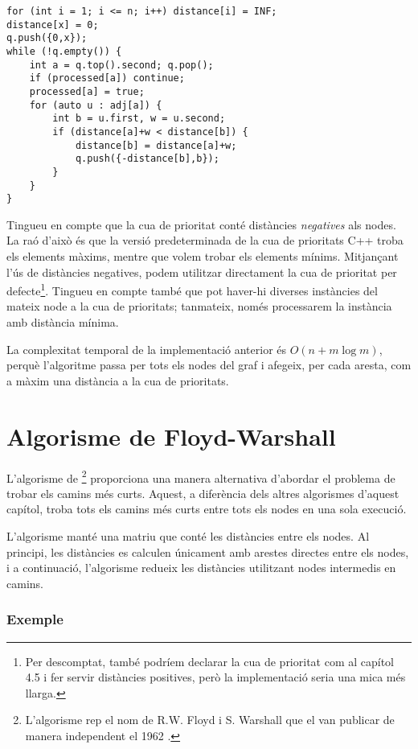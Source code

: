 \begin{lstlisting}
for (int i = 1; i <= n; i++) distance[i] = INF;
distance[x] = 0;
q.push({0,x});
while (!q.empty()) {
    int a = q.top().second; q.pop();
    if (processed[a]) continue;
    processed[a] = true;
    for (auto u : adj[a]) {
        int b = u.first, w = u.second;
        if (distance[a]+w < distance[b]) {
            distance[b] = distance[a]+w;
            q.push({-distance[b],b});
        }
    }
}
\end{lstlisting}


Tingueu en compte que la cua de prioritat conté distàncies
\emph{negatives} als nodes. La raó d'això és que la versió
predeterminada de la cua de prioritats C++ troba els elements màxims,
mentre que volem trobar els elements mínims. Mitjançant l'ús de
distàncies negatives, podem utilitzar directament la cua de prioritat
per defecte\footnote{Per descomptat, també podríem declarar la cua de
prioritat com al capítol 4.5 i fer servir distàncies positives, però
la implementació seria una mica més llarga.}. Tingueu en compte també
que pot haver-hi diverses instàncies del mateix node a la cua de
prioritats; tanmateix, només processarem la instància amb distància
mínima.

La complexitat temporal de la implementació anterior és $O(n+m \log
m)$, perquè l'algoritme passa per tots els nodes del graf i afegeix, per
cada aresta, com a màxim una distància a la cua de prioritats.

\section{Algorisme de Floyd-Warshall}


L'algorisme de \footnote{L'algorisme rep el nom de
R.W. Floyd i S. Warshall que el van publicar de manera independent el
1962 \cite{flo62,war62}.} proporciona una manera alternativa d'abordar
el problema de trobar els camins més curts. Aquest, a diferència dels
altres algorismes d'aquest capítol, troba tots els camins més curts
entre tots els nodes en una sola execució.

L'algorisme manté una matriu que conté les distàncies entre els
nodes. Al principi, les distàncies es calculen únicament amb arestes
directes entre els nodes, i a continuació, l'algorisme redueix les
distàncies utilitzant nodes intermedis en camins.

\subsubsection{Exemple}

